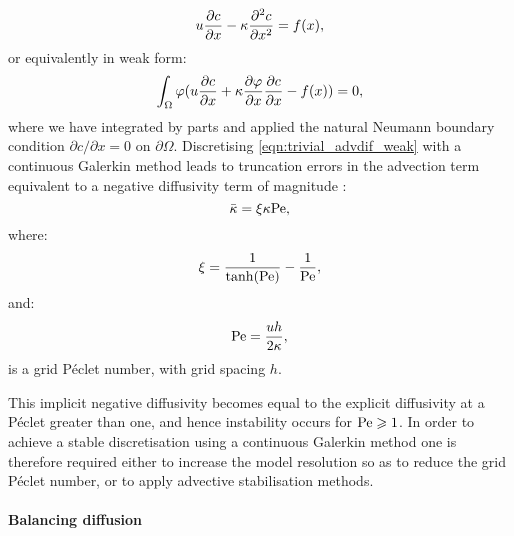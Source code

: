 \begin{equation}\label{eqn:trivial_advdif}
  u \frac{\partial c}{\partial x} - \kappa \frac{\partial^2c}{\partial x^2} = f(x),
\end{equation}
or equivalently in weak form:
\begin{equation}\label{eqn:trivial_advdif_weak}
  \int_\Omega \varphi (u \frac{\partial c}{\partial x} + \kappa \frac{\partial\varphi}{\partial x} \frac{\partial c}{\partial x} - f(x)) = 0,
\end{equation}
where we have integrated by parts and applied the natural Neumann boundary
condition $\partial c / \partial x = 0$ on $\partial \Omega$.
Discretising \eqref{eqn:trivial_advdif_weak} with a continuous Galerkin method
leads to truncation errors in the advection term equivalent to a negative
diffusivity term of magnitude \citep{DoneaBook}:
\begin{equation}\label{eqn:cg_implicit_diffusivity}
  \bar{\kappa} = \xi \kappa \mathrm{Pe},
\end{equation}
where:
\begin{equation}\label{eqn:xi_parameter}
  \xi = \frac{1}{\tanh(\mathrm{Pe})} - \frac{1}{\mathrm{Pe}},
\end{equation}
and:
\begin{equation}\label{eqn:grid_pe}
  \mathrm{Pe} = \frac{u h}{2 \kappa},
\end{equation}
is a grid P\'eclet number, with grid spacing $h$.

This implicit negative diffusivity becomes
equal to the explicit diffusivity at a P\'eclet greater than one, and hence
instability occurs for $\mathrm{Pe} \geqslant 1$. In order to achieve a stable discretisation
using a continuous Galerkin method one is therefore required either to increase
the model resolution so as to reduce the grid P\'eclet number, or to apply
advective stabilisation methods.

\paragraph{Balancing diffusion}\label{sec:balancing_diffusion}

